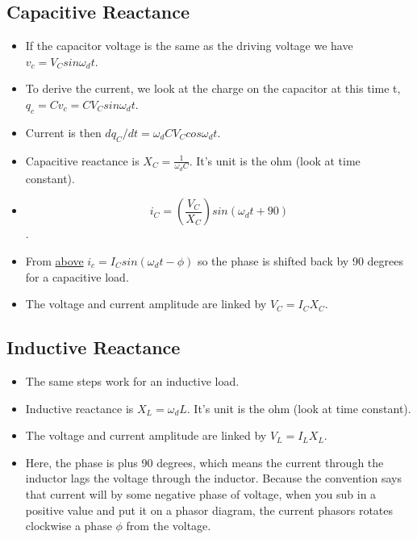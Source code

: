 \documentclass[11pt]{article}
\begin{document}
\hypertarget{capacitive-reactance}{%
\subsection{Capacitive Reactance}\label{capacitive-reactance}}

\begin{itemize}
\tightlist
\item
  If the capacitor voltage is the same as the driving voltage we have
  \(v_c = V_Csin\omega_dt\).
\item
  To derive the current, we look at the charge on the capacitor at this
  time t, \(q_c = Cv_c = CV_Csin\omega_dt\).
\item
  Current is then \(dq_C/dt = \omega_dCV_Ccos\omega_dt\).
\item
  Capacitive reactance is \(X_C = \frac{1}{\omega_dC}\). It's unit is
  the ohm (look at time constant).
\item
  \[i_C = (\frac{V_C}{X_C})sin(\omega_dt + 90)\].
\item
  From \protect\hyperlink{Alternatingux5cux2520Current}{above}
  \(i_c = I_Csin(\omega_dt - \phi)\) so the phase is shifted back by 90
  degrees for a capacitive load.
\item
  The voltage and current amplitude are linked by \(V_C = I_CX_C\).
\end{itemize}

\hypertarget{inductive-reactance}{%
\subsection{Inductive Reactance}\label{inductive-reactance}}

\begin{itemize}
\tightlist
\item
  The same steps work for an inductive load.
\item
  Inductive reactance is \(X_L = \omega_dL\). It's unit is the ohm (look
  at time constant).
\item
  The voltage and current amplitude are linked by \(V_L = I_LX_L\).
\item
  Here, the phase is plus 90 degrees, which means the current through
  the inductor lags the voltage through the inductor. Because the
  convention says that current will by some negative phase of voltage,
  when you sub in a positive value and put it on a phasor diagram, the
  current phasors rotates clockwise a phase \(\phi\) from the voltage.
\end{itemize}
\end{document}
